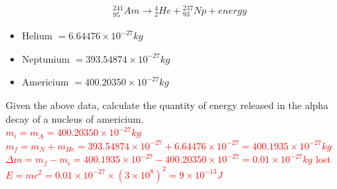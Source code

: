 \documentclass[12pt]{report}
\makeatletter
\DeclareRobustCommand{\StudentVSpace}[2]{%
	\ifthenelse{\boolean{@answer}}
	{\textcolor{red}{\\#1}}
	{\vspace{#2}}
}
\makeatother
\begin{document}
\begin{align*}
	{}^{241}_{95}Am \rightarrow {}^{4}_{2}He + {}^{237}_{93}Np + energy
\end{align*}

\begin{itemize}
	\item Helium $= 6.64476 \times 10^{-27}kg$
	\item Neptunium $= 393.54874 \times 10^{-27}kg$
	\item Americium $= 400.20350 \times 10^{-27}kg$
\end{itemize}

Given the above data, calculate the quantity of energy released in the alpha decay of a nucleus of americium.
\StudentVSpace{
	$m_{i} = m_{A} = 400.20350 \times 10^{-27}kg$\\
	$m_{f} = m_{N} + m_{He} = 393.54874 \times 10^{-27} + 6.64476 \times 10^{-27} = 400.1935 \times 10^{-27}kg$\\
	$\Delta m = m_{f} - m_{i} = 400.1935 \times 10^{-27} - 400.20350 \times 10^{-27} = 0.01 \times 10^{-27}kg$ lost\\
	$E = mc^{2} = 0.01 \times 10^{-27} \times (3\times10^{8})^{2} = 9\times10^{-13}J$
}{4cm}

\newpage

\end{document}
